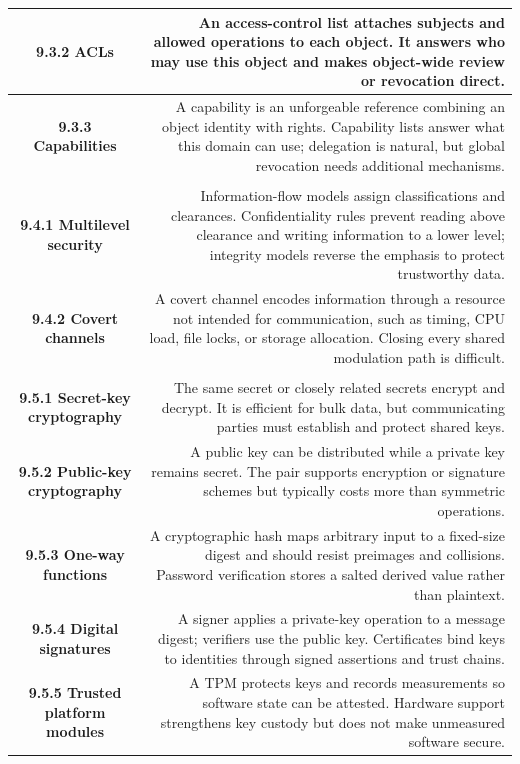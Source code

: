 \documentclass[10pt,letterpaper]{article}
\begin{document}
\begin{longtable}{C N}
\textbf{9.3.2 ACLs} & An access-control list attaches subjects and allowed operations to each object. It answers who may use this object and makes object-wide review or revocation direct.\\\hline
\textbf{9.3.3 Capabilities} & A capability is an unforgeable reference combining an object identity with rights. Capability lists answer what this domain can use; delegation is natural, but global revocation needs additional mechanisms.\\\hline
{}\\*\hline
\textbf{9.4.1 Multilevel security} & Information-flow models assign classifications and clearances. Confidentiality rules prevent reading above clearance and writing information to a lower level; integrity models reverse the emphasis to protect trustworthy data.\\\hline
\textbf{9.4.2 Covert channels} & A covert channel encodes information through a resource not intended for communication, such as timing, CPU load, file locks, or storage allocation. Closing every shared modulation path is difficult.\\\hline
{}\\*\hline
\textbf{9.5.1 Secret-key cryptography} & The same secret or closely related secrets encrypt and decrypt. It is efficient for bulk data, but communicating parties must establish and protect shared keys.\\\hline
\textbf{9.5.2 Public-key cryptography} & A public key can be distributed while a private key remains secret. The pair supports encryption or signature schemes but typically costs more than symmetric operations.\\\hline
\textbf{9.5.3 One-way functions} & A cryptographic hash maps arbitrary input to a fixed-size digest and should resist preimages and collisions. Password verification stores a salted derived value rather than plaintext.\\\hline
\textbf{9.5.4 Digital signatures} & A signer applies a private-key operation to a message digest; verifiers use the public key. Certificates bind keys to identities through signed assertions and trust chains.\\\hline
\textbf{9.5.5 Trusted platform modules} & A TPM protects keys and records measurements so software state can be attested. Hardware support strengthens key custody but does not make unmeasured software secure.\\\hline

\end{longtable}
\end{document}
